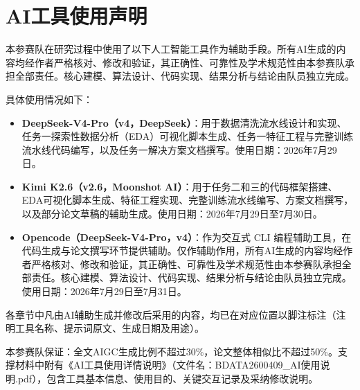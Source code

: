 \section*{AI工具使用声明}
\nocite{deepseek2026,kimi2026}

本参赛队在研究过程中使用了以下人工智能工具作为辅助手段。所有AI生成的内容均经作者严格核对、修改和验证，其正确性、可靠性及学术规范性由本参赛队承担全部责任。核心建模、算法设计、代码实现、结果分析与结论由队员独立完成。

具体使用情况如下：

\begin{itemize}[itemsep=4pt]
\item \textbf{DeepSeek-V4-Pro（v4，DeepSeek）}：用于数据清洗流水线设计和实现、任务一探索性数据分析（EDA）可视化脚本生成、任务一特征工程与完整训练流水线代码编写，以及任务一解决方案文档撰写。使用日期：2026年7月29日。

\item \textbf{Kimi K2.6（v2.6，Moonshot AI）}：用于任务二和三的代码框架搭建、EDA可视化脚本生成、特征工程实现、完整训练流水线编写、方案文档撰写，以及部分论文草稿的辅助生成。使用日期：2026年7月29日至7月30日。

\item \textbf{Opencode（DeepSeek-V4-Pro，v4）}：作为交互式 CLI 编程辅助工具，在代码生成与论文撰写环节提供辅助。仅作辅助作用，所有AI生成的内容均经作者严格核对、修改和验证，其正确性、可靠性及学术规范性由本参赛队承担全部责任。核心建模、算法设计、代码实现、结果分析与结论由队员独立完成。使用日期：2026年7月29日至7月31日。
\end{itemize}

各章节中凡由AI辅助生成并修改后采用的内容，均已在对应位置以脚注标注（注明工具名称、提示词原文、生成日期及用途）。

本参赛队保证：全文AIGC生成比例不超过30\%，论文整体相似比不超过50\%。支撑材料中附有《AI工具使用详情说明》（文件名：BDATA2600409\_AI使用说明.pdf），包含工具基本信息、使用目的、关键交互记录及采纳修改说明。
